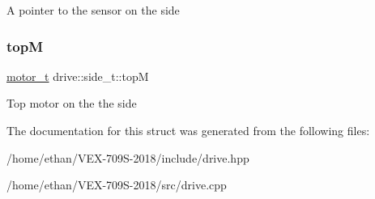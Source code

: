 A pointer to the sensor on the side \mbox{\label{structdrive_1_1side__t_a3a32e841a8f53200b37c040572765165}} 
\subsubsection{\texorpdfstring{topM}{topM}}
{\footnotesize\ttfamily \hyperlink{structmotor__t}{motor\+\_\+t} drive\+::side\+\_\+t\+::topM}

Top motor on the the side 

The documentation for this struct was generated from the following files\+:\begin{DoxyCompactItemize}
\item 
/home/ethan/\+V\+E\+X-\/709\+S-\/2018/include/drive.\+hpp\item 
/home/ethan/\+V\+E\+X-\/709\+S-\/2018/src/drive.\+cpp\end{DoxyCompactItemize}
